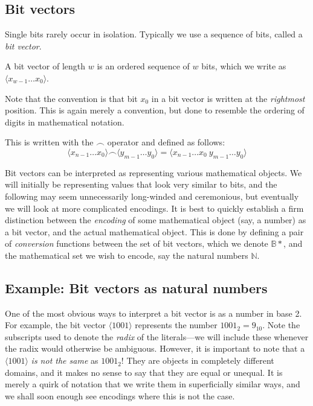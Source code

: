 \subsection{Bit vectors}

\newcommand\bitvector[1]{\langle #1 \rangle}
\newcommand\bitconcat{\frown}

Single bits rarely occur in isolation.  Typically we use a sequence of
bits, called a \emph{bit vector}.

\begin{definition}
  A bit vector of length $w$ is an ordered sequence of $w$ bits, which
  we write as $\bitvector{x_{w-1}\ldots{}x_{0}}$.
\end{definition}

Note that the convention is that bit $x_{0}$ in a bit vector is
written at the \emph{rightmost} position.  This is again merely a
convention, but done to resemble the ordering of digits in
mathematical notation.

\begin{definition}
  This is written with the $\bitconcat$ operator and defined as
  follows:
  \[
    \bitvector{x_{n-1}\ldots{}x_{0}} \bitconcat \bitvector{y_{m-1}\ldots{}y_{0}} =
    \bitvector{x_{n-1}\ldots{}x_{0}~y_{m-1}\ldots{}y_{0}}
  \]
\end{definition}


Bit vectors can be interpreted as representing various mathematical
objects.  We will initially be representing values that look very
similar to bits, and the following may seem unnecessarily long-winded
and ceremonious, but eventually we will look at more complicated
encodings.  It is best to quickly establish a firm distinction between
the \emph{encoding} of some mathematical object (say, a number) as a
bit vector, and the actual mathematical object.  This is done by
defining a pair of \emph{conversion} functions between the set of bit
vectors, which we denote $\mathbb{B}*$, and the mathematical set we
wish to encode, say the natural numbers $\mathbb{N}$.

\subsection{Example: Bit vectors as natural numbers}

One of the most obvious ways to interpret a bit vector is as a number
in base 2.  For example, the bit vector $\bitvector{1001}$ represents
the number $1001_{2} = 9_{10}$.  Note the subscripts used to denote
the \emph{radix} of the literals---we will include these whenever the
radix would otherwise be ambiguous.  However, it is important to note
that a $\bitvector{1001}$ \emph{is not the same} as $1001_{2}$!  They
are objects in completely different domains, and it makes no sense to
say that they are equal or unequal.  It is merely a quirk of notation
that we write them in superficially similar ways, and we shall soon
enough see encodings where this is not the case.


